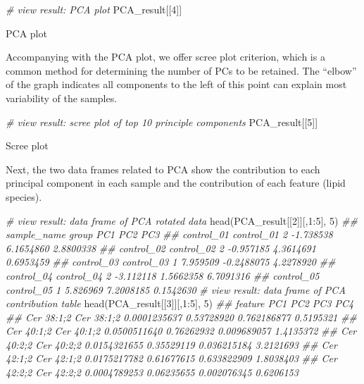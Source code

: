 \documentclass[]{article}
\newcommand{\hlnum}[1]{\textcolor[rgb]{0.816,0.125,0.439}{#1}}%
\newcommand{\hlcom}[1]{\textcolor[rgb]{0.502,0.502,0.502}{\textit{#1}}}%
\newcommand{\hlopt}[1]{\textcolor[rgb]{0,0,0}{#1}}%
\newcommand{\hlstd}[1]{\textcolor[rgb]{0.251,0.251,0.251}{#1}}%
\newcommand{\hlkwd}[1]{\textcolor[rgb]{0.878,0.439,0.125}{#1}}%
\newenvironment{Shaded}{\begin{myshaded}}{\end{myshaded}}
\newcommand{\KeywordTok}[1]{\hlkwd{#1}}
\newcommand{\DecValTok}[1]{\hlnum{#1}}
\newcommand{\CommentTok}[1]{\hlcom{#1}}
\newcommand{\OperatorTok}[1]{\hlopt{#1}}
\newcommand{\NormalTok}[1]{\hlstd{#1}}
\begin{document}
\begin{Shaded}
\begin{Highlighting}[]
\CommentTok{# view result: PCA plot}
\NormalTok{PCA_result[[}\DecValTok{4}\NormalTok{]]}
\end{Highlighting}
\end{Shaded}

\label{fig:unnamed-chunk-6}PCA plot

Accompanying with the PCA plot, we offer scree plot criterion, which is a common method for determining the number of PCs to be retained. The ``elbow'' of the graph indicates all components to the left of this point can explain most variability of the samples.

\begin{Shaded}
\begin{Highlighting}[]
\CommentTok{# view result: scree plot of top 10 principle components}
\NormalTok{PCA_result[[}\DecValTok{5}\NormalTok{]] }
\end{Highlighting}
\end{Shaded}

\label{fig:unnamed-chunk-7}Scree plot

Next, the two data frames related to PCA show the contribution to each principal component in each sample and the contribution of each feature (lipid species).

\begin{Shaded}
\begin{Highlighting}[]
\CommentTok{# view result: data frame of PCA rotated data}
\KeywordTok{head}\NormalTok{(PCA_result[[}\DecValTok{2}\NormalTok{]][,}\DecValTok{1}\OperatorTok{:}\DecValTok{5}\NormalTok{], }\DecValTok{5}\NormalTok{)}
\CommentTok{##            sample_name group       PC1        PC2       PC3}
\CommentTok{## control_01  control_01     2 -1.738538  6.1654860 2.8800338}
\CommentTok{## control_02  control_02     2 -0.957185  4.3614691 0.6953459}
\CommentTok{## control_03  control_03     1  7.959509 -0.2488075 4.2278920}
\CommentTok{## control_04  control_04     2 -3.112118  1.5662358 6.7091316}
\CommentTok{## control_05  control_05     1  5.826969  7.2008185 0.1542630}
\CommentTok{# view result: data frame of PCA contribution table}
\KeywordTok{head}\NormalTok{(PCA_result[[}\DecValTok{3}\NormalTok{]][,}\DecValTok{1}\OperatorTok{:}\DecValTok{5}\NormalTok{], }\DecValTok{5}\NormalTok{)}
\CommentTok{##               feature          PC1        PC2         PC3       PC4}
\CommentTok{## Cer 38:1;2 Cer 38:1;2 0.0001235637 0.53728920 0.762186877 0.5195321}
\CommentTok{## Cer 40:1;2 Cer 40:1;2 0.0500511640 0.76262932 0.009689057 1.4135372}
\CommentTok{## Cer 40:2;2 Cer 40:2;2 0.0154321655 0.35529119 0.036215184 3.2121693}
\CommentTok{## Cer 42:1;2 Cer 42:1;2 0.0175217782 0.61677615 0.633822909 1.8038403}
\CommentTok{## Cer 42:2;2 Cer 42:2;2 0.0004789253 0.06235655 0.002076345 0.6206153}
\end{Highlighting}
\end{Shaded}
\end{document}
